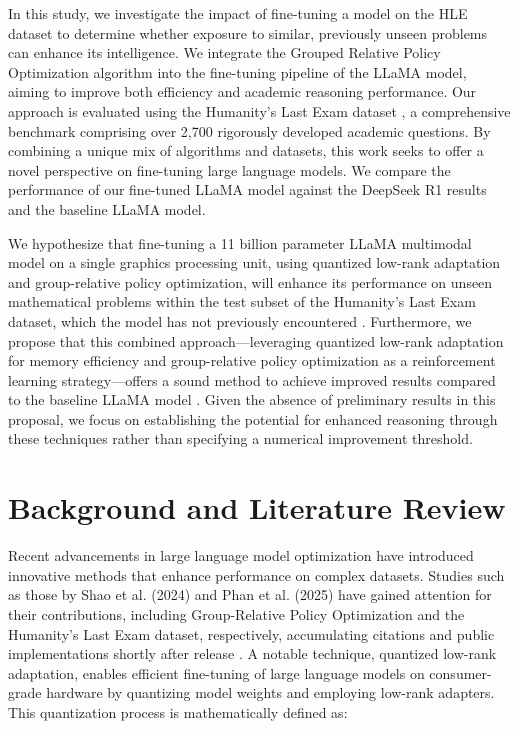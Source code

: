 \documentclass{svproc}
\begin{document}
In this study, we investigate the impact of fine-tuning a model on the HLE dataset to determine whether exposure to similar, previously unseen problems can enhance its intelligence. We integrate the Grouped Relative Policy Optimization algorithm into the fine-tuning pipeline of the LLaMA model, aiming to improve both efficiency and academic reasoning performance. Our approach is evaluated using the Humanity's Last Exam dataset \cite{phan2025humanitysexam}, a comprehensive benchmark comprising over 2,700 rigorously developed academic questions. By combining a unique mix of algorithms and datasets, this work seeks to offer a novel perspective on fine-tuning large language models. We compare the performance of our fine-tuned LLaMA model against the DeepSeek R1 results and the baseline LLaMA model.

We hypothesize that fine-tuning a 11 billion parameter LLaMA multimodal model on a single graphics processing unit, using quantized low-rank adaptation and group-relative policy optimization, will enhance its performance on unseen mathematical problems within the test subset of the Humanity’s Last Exam dataset, which the model has not previously encountered \cite{phan2025humanitysexam}. Furthermore, we propose that this combined approach—leveraging quantized low-rank adaptation for memory efficiency and group-relative policy optimization as a reinforcement learning strategy—offers a sound method to achieve improved results compared to the baseline LLaMA model \cite{dettmers2023qloraefficientfinetuningquantized, shao2024deepseekmathpushinglimitsmathematical}. Given the absence of preliminary results in this proposal, we focus on establishing the potential for enhanced reasoning through these techniques rather than specifying a numerical improvement threshold.


\section{Background and Literature Review}

Recent advancements in large language model optimization have introduced innovative methods that enhance performance on complex datasets. Studies such as those by Shao et al. (2024) and Phan et al. (2025) have gained attention for their contributions, including Group-Relative Policy Optimization and the Humanity's Last Exam dataset, respectively, accumulating citations and public implementations shortly after release \cite{shao2024deepseekmathpushinglimitsmathematical,phan2025humanitysexam}. A notable technique, quantized low-rank adaptation, enables efficient fine-tuning of large language models on consumer-grade hardware by quantizing model weights and employing low-rank adapters. This quantization process is mathematically defined as:
\end{document}
